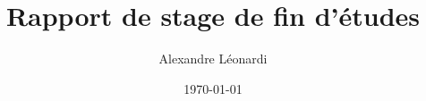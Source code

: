 \documentclass[10pt]{article}
\title{Rapport de stage de fin d'études}
\author{Alexandre Léonardi}
\date{\today}
\begin{document}
\begin{titlepage}
	\maketitle
\end{titlepage}

\linespread{1.15} %

\setcounter{tocdepth}{2}
\tableofcontents
{}
\pagebreak

\pagebreak

\pagebreak

\pagebreak

\pagebreak

\pagebreak

\pagebreak

\pagebreak

\pagebreak
\listoffigures
\pagebreak
\lstlistoflistings
\pagebreak
\printbibliography
\end{document}
